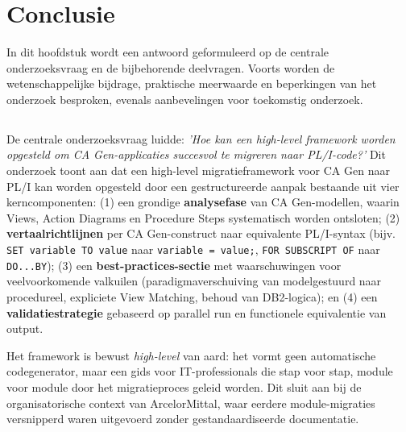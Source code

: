 
\chapter{Conclusie}%
\label{ch:conclusie}

In dit hoofdstuk wordt een antwoord geformuleerd op de centrale onderzoeksvraag en de bijbehorende deelvragen. 
Voorts worden de wetenschappelijke bijdrage, praktische meerwaarde en beperkingen van het onderzoek besproken, 
evenals aanbevelingen voor toekomstig onderzoek.

\section{}%
\label{sec:antwoord-hoofdvraag}

De centrale onderzoeksvraag luidde: \textit{'Hoe kan een high-level framework worden opgesteld om CA Gen-applicaties
    succesvol te migreren naar PL/I-code?'}
Dit onderzoek toont aan dat een high-level migratieframework voor CA Gen naar PL/I kan worden opgesteld door een 
gestructureerde aanpak bestaande uit vier kerncomponenten: (1) een grondige \textbf{analysefase} van CA Gen-modellen, 
waarin Views, Action Diagrams en Procedure Steps systematisch worden ontsloten; (2) \textbf{vertaalrichtlijnen} 
per CA Gen-construct naar equivalente PL/I-syntax (bijv. \texttt{SET variable TO value} naar 
\texttt{variable = value;}, \texttt{FOR SUBSCRIPT OF} naar \texttt{DO...BY}); (3) een 
\textbf{best-practices-sectie} met waarschuwingen voor veelvoorkomende valkuilen 
(paradigmaverschuiving van modelgestuurd naar procedureel, expliciete View Matching, behoud van DB2-logica);
en (4) een \textbf{validatiestrategie} gebaseerd op parallel run en functionele equivalentie van output.

Het framework is bewust \textit{high-level} van aard: het vormt geen automatische codegenerator, maar een gids 
voor IT-professionals die stap voor stap, module voor module door het migratieproces geleid worden. 
Dit sluit aan bij de organisatorische context van ArcelorMittal, waar eerdere module-migraties versnipperd 
waren uitgevoerd zonder gestandaardiseerde documentatie.

\section{}%
\label{sec:bevindingen-per-domein}

